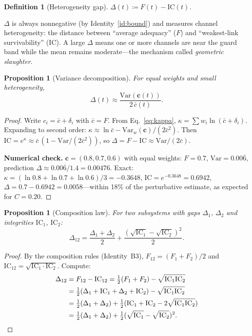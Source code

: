 \documentclass[
  aps,
  prd,
  twocolumn,
  superscriptaddress,
  nofootinbib,
  floatfix
]{revtex4-2}
\newtheorem{definition}[theorem]{Definition}
\newtheorem{proposition}[theorem]{Proposition}
\newcommand{\beq}{\begin{equation}}
\newcommand{\eeq}{\end{equation}}
\newcommand{\tvec}{\mathbf{c}}
\newcommand{\IC}{\mathrm{IC}}
\begin{document}
\begin{definition}[Heterogeneity gap]
$\Delta(t) \coloneqq F(t) - \IC(t)$.
\end{definition}

$\Delta$ is always nonnegative (by Identity~\ref{id:bound}) and
measures channel heterogeneity: the distance between ``average
adequacy'' ($F$) and ``weakest-link survivability'' ($\IC$).
A large $\Delta$ means one or more channels are near the guard
band while the mean remains moderate---the mechanism called
\emph{geometric slaughter}.

\begin{proposition}[Variance decomposition]
\label{prop:variance}
For equal weights and small heterogeneity,
\beq
  \Delta(t) \approx
  \frac{\mathrm{Var}(\tvec(t))}{2\,\bar{c}(t)}.
\eeq
\end{proposition}

\begin{proof}
Write $c_i = \bar{c} + \delta_i$ with $\bar{c} = F$.  From
Eq.~\ref{eq:kappa}, $\kappa = \sum w_i \ln(\bar{c} + \delta_i)$.
Expanding to second order:
$\kappa \approx \ln\bar{c} - \mathrm{Var}_w(\tvec)/(2\bar{c}^2)$.
Then $\IC = e^\kappa \approx \bar{c}\,(1 - \mathrm{Var}/(2\bar{c}^2))$,
so $\Delta = F - \IC \approx \mathrm{Var}/(2\bar{c})$.

\noindent\textbf{Numerical check.}  $\tvec = (0.8, 0.7, 0.6)$
with equal weights: $F = 0.7$, $\mathrm{Var} = 0.00\overline{6}$,
prediction $\Delta \approx 0.00\overline{6}/1.4 = 0.00476$.
Exact: $\kappa = (\ln 0.8 + \ln 0.7 + \ln 0.6)/3 = -0.3648$,
$\IC = e^{-0.3648} = 0.6942$,
$\Delta = 0.7 - 0.6942 = 0.0058$---within 18\% of the
perturbative estimate, as expected for $C = 0.20$.
\end{proof}

\begin{proposition}[Composition law]
\label{prop:gap_comp}
For two subsystems with gaps $\Delta_1$, $\Delta_2$ and
integrities $\IC_1$, $\IC_2$:
\beq
  \Delta_{12} = \frac{\Delta_1+\Delta_2}{2}
    + \frac{(\sqrt{\IC_1}-\sqrt{\IC_2})^2}{2}.
\eeq
\end{proposition}

\begin{proof}
By the composition rules (Identity~B3), $F_{12} = (F_1 + F_2)/2$
and $\IC_{12} = \sqrt{\IC_1 \cdot \IC_2}$.  Compute:
\begin{align*}
  \Delta_{12}
  &= F_{12} - \IC_{12}
   = \tfrac{1}{2}(F_1 + F_2) - \sqrt{\IC_1 \IC_2} \\
  &= \tfrac{1}{2}(\Delta_1 + \IC_1 + \Delta_2 + \IC_2)
     - \sqrt{\IC_1 \IC_2} \\
  &= \tfrac{1}{2}(\Delta_1 + \Delta_2)
     + \tfrac{1}{2}(\IC_1 + \IC_2 - 2\sqrt{\IC_1\IC_2}) \\
  &= \tfrac{1}{2}(\Delta_1 + \Delta_2)
     + \tfrac{1}{2}(\sqrt{\IC_1} - \sqrt{\IC_2})^2.\qedhere
\end{align*}
\end{proof}
\end{document}
